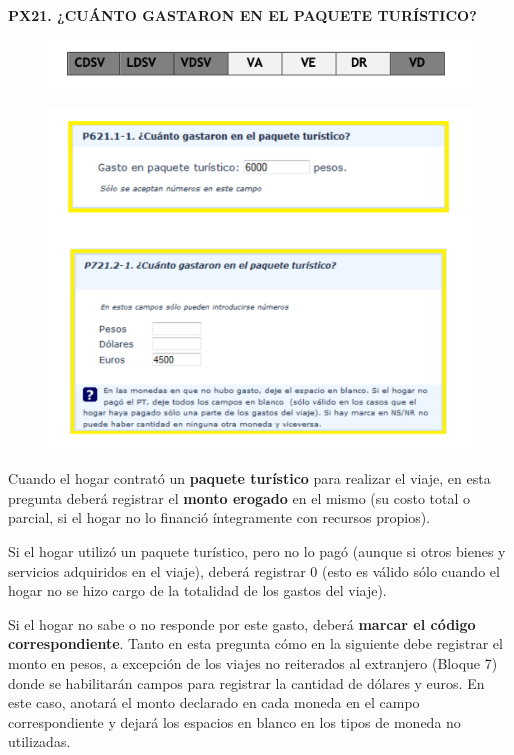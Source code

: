 \documentclass[
  openany]{book}
\begin{document}
\textbf{PX21. ¿CUÁNTO GASTARON EN EL PAQUETE TURÍSTICO?}

\begin{figure}

{\centering \includegraphics[width=1\linewidth]{imagenes/figura6-121} 

}

\end{figure}

\begin{figure}

{\centering \includegraphics[width=1\linewidth]{imagenes/figura6-122} 

}

\end{figure}

Cuando el hogar contrató un \textbf{paquete turístico} para realizar el viaje, en esta pregunta deberá registrar el \textbf{monto erogado} en el mismo (su costo total o parcial, si el hogar no lo financió íntegramente con recursos propios).

Si el hogar utilizó un paquete turístico, pero no lo pagó (aunque si otros bienes y servicios adquiridos en el viaje), deberá registrar 0 (esto es válido sólo cuando el hogar no se hizo cargo de la totalidad de los gastos del viaje).

Si el hogar no sabe o no responde por este gasto, deberá \textbf{marcar el código correspondiente}. Tanto en esta pregunta cómo en la siguiente debe registrar el monto en pesos, a excepción de los viajes no reiterados al extranjero (Bloque 7) donde se habilitarán campos para registrar la cantidad de dólares y euros. En este caso, anotará el monto declarado en cada moneda en el campo correspondiente y dejará los espacios en blanco en los tipos de moneda no utilizadas.
\end{document}
